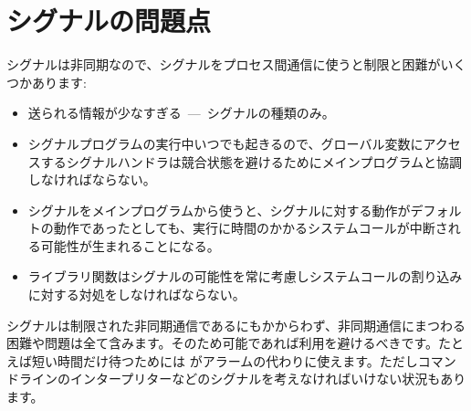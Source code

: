 \section{シグナルの問題点}

シグナルは非同期なので、シグナルをプロセス間通信に使うと制限と困難がいくつかあります:
%
\begin{itemize}

\item 送られる情報が少なすぎる~---~シグナルの種類のみ。

\item シグナルプログラムの実行中いつでも起きるので、グローバル変数にアクセスするシグナルハンドラは競合状態を避けるためにメインプログラムと協調しなければならない。

\item シグナルをメインプログラムから使うと、シグナルに対する動作がデフォルトの動作であったとしても、実行に時間のかかるシステムコールが中断される可能性が生まれることになる。

\item ライブラリ関数はシグナルの可能性を常に考慮しシステムコールの割り込みに対する対処をしなければならない。

\end{itemize}
%

シグナルは制限された非同期通信であるにもかからわず、非同期通信にまつわる困難や問題は全て含みます。そのため可能であれば利用を避けるべきです。たとえば短い時間だけ待つためには  がアラームの代わりに使えます。ただしコマンドラインのインタープリターなどのシグナルを考えなければいけない状況もあります。


